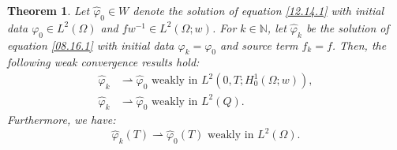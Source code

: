 \documentclass[10pt,a4paper]{amsart}
\newtheorem{theorem}{Theorem}
\begin{document}
 \begin{theorem}\label{08.16.T1}
Let $\widehat{\varphi}_0 \in W$ denote the solution of equation \eqref{12.14.1} with initial data $\varphi_0 \in L^2(\Omega)$ and $fw^{-1} \in L^2(\Omega;w)$. For $k \in \mathbb{N}$, let $\widehat{\varphi}_k$ be the solution of equation \eqref{08.16.1} with initial data $\varphi_k = \varphi_0$ and source term $f_k = f$. Then, the following weak convergence results hold:
\begin{equation}\label{08.22.1}
\begin{split}
\widehat{\varphi}_k &\rightharpoonup \widehat{\varphi}_0   \text{  weakly in } L^2(0,T; H_0^1(\Omega;w)), \\
\widehat{\varphi}_k &\rightharpoonup \widehat{\varphi}_0   \text{  weakly in } L^2(Q).
\end{split}
\end{equation}
Furthermore, we have:
\begin{equation}\label{12.09.5}
\widehat{\varphi}_k(T) \rightharpoonup \widehat{\varphi}_0(T) \text{  weakly in } L^2(\Omega).
\end{equation}
\end{theorem}
\end{document}
